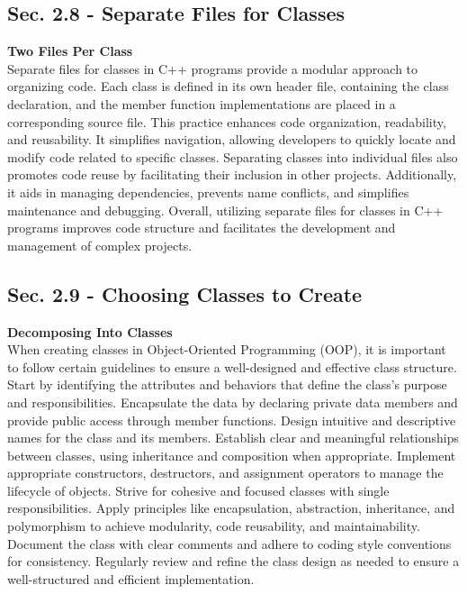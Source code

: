 \subsection{Sec. 2.8 - Separate Files for Classes}
\noindent \textbf{Two Files Per Class} \\

Separate files for classes in C++ programs provide a modular approach to organizing code. Each class is defined in its own header file, containing the class declaration, and the member function implementations are placed in a corresponding source 
file. This practice enhances code organization, readability, and reusability. It simplifies navigation, allowing developers to quickly locate and modify code related to specific classes. Separating classes into individual files also promotes code 
reuse by facilitating their inclusion in other projects. Additionally, it aids in managing dependencies, prevents name conflicts, and simplifies maintenance and debugging. Overall, utilizing separate files for classes in C++ programs improves code 
structure and facilitates the development and management of complex projects. \\

\subsection{Sec. 2.9 - Choosing Classes to Create}
\noindent \textbf{Decomposing Into Classes} \\

When creating classes in Object-Oriented Programming (OOP), it is important to follow certain guidelines to ensure a well-designed and effective class structure. Start by identifying the attributes and behaviors that define the class's purpose and 
responsibilities. Encapsulate the data by declaring private data members and provide public access through member functions. Design intuitive and descriptive names for the class and its members. Establish clear and meaningful relationships between 
classes, using inheritance and composition when appropriate. Implement appropriate constructors, destructors, and assignment operators to manage the lifecycle of objects. Strive for cohesive and focused classes with single responsibilities. Apply 
principles like encapsulation, abstraction, inheritance, and polymorphism to achieve modularity, code reusability, and maintainability. Document the class with clear comments and adhere to coding style conventions for consistency. Regularly review 
and refine the class design as needed to ensure a well-structured and efficient implementation. \\

